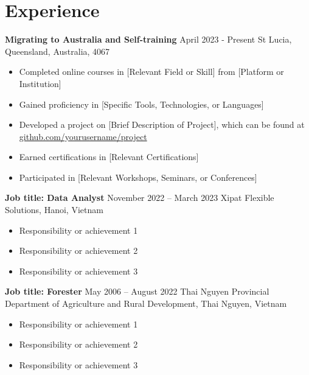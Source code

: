 \documentclass[a4paper,12pt]{article}
\begin{document}
\section*{Experience}
\noindent
\textbf{Migrating to Australia and Self-training} \hfill April 2023 - Present \newline
St Lucia, Queensland, Australia, 4067 \newline
\vspace{-1.5em} %
\begin{itemize}
    \item Completed online courses in [Relevant Field or Skill] from [Platform or Institution]
    \item Gained proficiency in [Specific Tools, Technologies, or Languages]
    \item Developed a project on [Brief Description of Project], which can be found at \href{https://github.com/yourusername/project}{github.com/yourusername/project}
    \item Earned certifications in [Relevant Certifications]
    \item Participated in [Relevant Workshops, Seminars, or Conferences]
\end{itemize}

\vspace{1em} %
\noindent
\textbf{Job title: Data Analyst} \hfill November 2022 -- March 2023 \newline
Xipat Flexible Solutions, Hanoi, Vietnam \newline
\vspace{-1.5em} %
\begin{itemize}
    \item Responsibility or achievement 1
    \item Responsibility or achievement 2
    \item Responsibility or achievement 3
\end{itemize}

\vspace{1em} %
\noindent
\textbf{Job title: Forester} \hfill May 2006 -- August 2022 \newline
Thai Nguyen Provincial Department of Agriculture and Rural Development, Thai Nguyen, Vietnam \newline
\vspace{-1.5em} %
\begin{itemize}
    \item Responsibility or achievement 1
    \item Responsibility or achievement 2
    \item Responsibility or achievement 3
\end{itemize}
\end{document}
